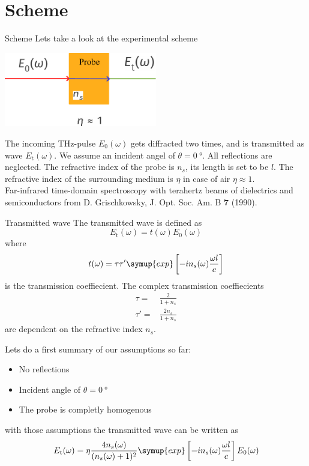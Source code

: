 \documentclass[aspectratio=1610, 9pt]{beamer}
\begin{document}
\section{Scheme}
\begin{frame}{Scheme}
  Lets take a look at the experimental scheme\\
  \begin{center}
    \includegraphics[width=0.5\textwidth]{images/Transmission.pdf}
\end{center}
The incoming THz-pulse $E_0(\omega)$ gets diffracted two times, and is transmitted as wave $E_\text{t}(\omega)$.
We assume an incident angel of $\theta=\SI{0}{\degree}$.
All reflections are neglected.
The refractive index of the probe is $n_s$, its length is set to be $l$.
The refractive index of the surrounding medium is $\eta$ in case of air $\eta\approx 1$.\\
\textcolor{tugreen}{Far-infrared time-domain spectroscopy with terahertz beams of dielectrics and semiconductors} from D. Grischkowsky, J. Opt. Soc. Am. B \textbf{7} (1990).
\end{frame}

\begin{frame}{Transmitted wave}
  The transmitted wave is defined as 
  \begin{equation}
    E_\text{t}(\omega) = t(\omega) E_0(\omega)
  \end{equation}
  where
  \begin{equation}
    t(\omega) = \tau \tau' \symup{exp}\left[- i n_s(\omega) \frac{\omega l }{c}\right]
  \end{equation}
  is the transmission coeffiecient.
  The complex transmission coeffiecients 
  \begin{align}
    \tau = & \frac{2}{1 + n_s} \\
    \tau' = &  \frac{2 n_s}{1+ n_s} 
  \end{align}
  are dependent on the refractive index $n_s$.
\end{frame}

\begin{frame}
  Lets do a first summary of our assumptions so far:
  \begin{itemize}
    \item No reflections
    \item Incident angle of $\theta=\SI{0}{\degree}$
    \item The probe is completly homogenous
  \end{itemize}
  with those assumptions the transmitted wave can be written as 
  \begin{equation}
    E_\text{t}(\omega) = \eta\frac{4 n_s (\omega)}{(n_s(\omega) + 1)^2} \symup{exp}\left[ -i n_s (\omega) \frac{\omega l }{c}\right] E_0(\omega)
  \end{equation}
\end{frame}
\end{document}
